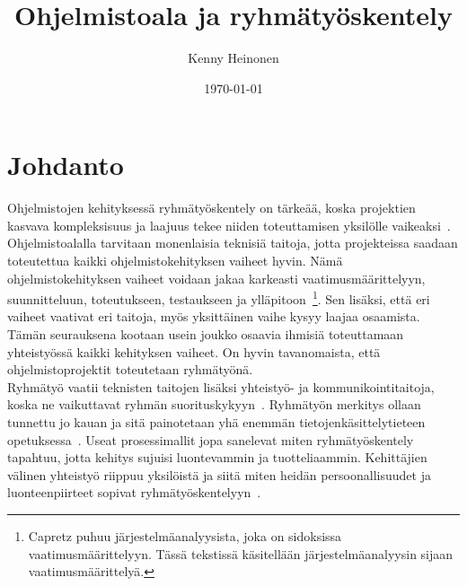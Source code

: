 \documentclass[finnish]{../tktltiki2}
\title{Ohjelmistoala ja ryhmätyöskentely}
\author{Kenny Heinonen}
\date{\today}
\theoremstyle{definition}
\theoremstyle{remark}
\begin{document}

\maketitle        %

\tableofcontents  %
\newpage          %



\section{Johdanto}

Ohjelmistojen kehityksessä ryhmätyöskentely on tärkeää, koska projektien
kasvava kompleksisuus ja laajuus tekee niiden toteuttamisen yksilölle
vaikeaksi~\cite{Jun:2010}.
Ohjelmistoalalla tarvitaan monenlaisia teknisiä taitoja, jotta projekteissa saadaan toteutettua kaikki ohjelmistokehityksen vaiheet 
hyvin. Nämä ohjelmistokehityksen vaiheet voidaan jakaa karkeasti 
vaatimusmäärittelyyn, suunnitteluun, toteutukseen, testaukseen ja 
ylläpitoon~\cite{Capretz:2010:MSS:1726559.1726574}\footnote{Capretz puhuu järjestelmäanalyysista, joka on sidoksissa vaatimusmäärittelyyn. Tässä tekstissä käsitellään järjestelmäanalyysin sijaan vaatimusmäärittelyä.}. Sen lisäksi, että 
eri vaiheet vaativat eri taitoja, myös yksittäinen vaihe kysyy laajaa 
osaamista. Tämän seurauksena kootaan usein joukko osaavia ihmisiä 
toteuttamaan yhteistyössä kaikki kehityksen vaiheet. On hyvin 
tavanomaista, että ohjelmistoprojektit toteutetaan ryhmätyönä.\\

Ryhmätyö vaatii teknisten taitojen lisäksi yhteistyö- ja kommunikointitaitoja, koska
ne vaikuttavat ryhmän suorituskykyyn~\cite{Hall:2007:CNT:1235000.1235043}. Ryhmätyön merkitys ollaan
tunnettu jo kauan ja sitä painotetaan yhä enemmän tietojenkäsittelytieteen opetuksessa~\cite{Cushing:2003:TBP:948785.948797,Jun:2010,1158709,Pieterse:2012:PPS:2157136.2157218}.
Useat prosessimallit jopa sanelevat miten ryhmätyöskentely tapahtuu, jotta kehitys sujuisi luontevammin ja tuotteliaammin.
Kehittäjien välinen yhteistyö riippuu yksilöistä ja siitä miten heidän persoonallisuudet ja
luonteenpiirteet sopivat ryhmätyöskentelyyn~\cite{Acuna:2008:ESP:1414004.1414056,Hall:2007:CNT:1235000.1235043}.\\
\end{document}
